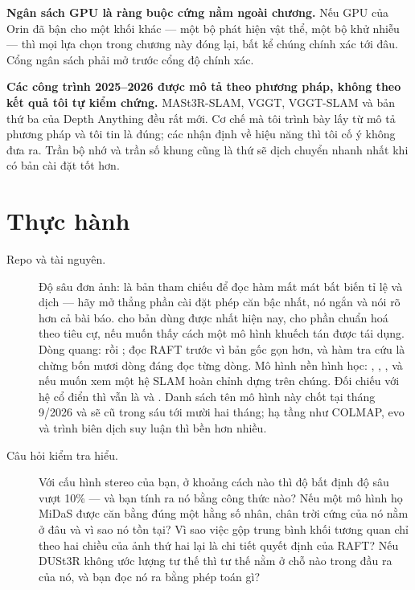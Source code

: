\documentclass[../../deep_learning.tex]{subfiles}
\begin{document}
\textbf{Ngân sách GPU là ràng buộc cứng nằm ngoài chương.} Nếu GPU của Orin đã bận cho một khối khác --- một bộ phát hiện vật thể, một bộ khử nhiễu --- thì mọi lựa chọn trong chương này đóng lại, bất kể chúng chính xác tới đâu. Cổng ngân sách phải mở trước cổng độ chính xác.

\textbf{Các công trình 2025--2026 được mô tả theo phương pháp, không theo kết quả tôi tự kiểm chứng.} MASt3R-SLAM, VGGT, VGGT-SLAM và bản thứ ba của Depth Anything đều rất mới. Cơ chế mà tôi trình bày lấy từ mô tả phương pháp và tôi tin là đúng; các nhận định về hiệu năng thì tôi cố ý không đưa ra. Trần bộ nhớ và trần số khung cũng là thứ sẽ dịch chuyển nhanh nhất khi có bản cài đặt tốt hơn.

\section{Thực hành}
\begin{description}
\item[Repo và tài nguyên.] Độ sâu đơn ảnh:  là bản tham chiếu để đọc hàm mất mát bất biến tỉ lệ và dịch --- hãy mở thẳng phần cài đặt phép căn bậc nhất, nó ngắn và nói rõ hơn cả bài báo.  cho bản dùng được nhất hiện nay,  cho phần chuẩn hoá theo tiêu cự,  nếu muốn thấy cách một mô hình khuếch tán được tái dụng. Dòng quang:  rồi ; đọc RAFT trước vì bản gốc gọn hơn, và hàm tra cứu là chừng bốn mươi dòng đáng đọc từng dòng. Mô hình nền hình học: , , , và  nếu muốn xem một hệ SLAM hoàn chỉnh dựng trên chúng. Đối chiếu với hệ cổ điển thì vẫn là  và . Danh sách tên mô hình này chốt tại tháng 9/2026 và sẽ cũ trong sáu tới mười hai tháng; hạ tầng như COLMAP, evo và trình biên dịch suy luận thì bền hơn nhiều.
\item[Câu hỏi kiểm tra hiểu.] Với cấu hình stereo của bạn, ở khoảng cách nào thì độ bất định độ sâu vượt 10\% --- và bạn tính ra nó bằng công thức nào? Nếu một mô hình họ MiDaS được căn bằng đúng một hằng số nhân, chân trời cứng của nó nằm ở đâu và vì sao nó tồn tại? Vì sao việc gộp trung bình khối tương quan chỉ theo hai chiều của ảnh thứ hai lại là chi tiết quyết định của RAFT? Nếu DUSt3R không ước lượng tư thế thì tư thế nằm ở chỗ nào trong đầu ra của nó, và bạn đọc nó ra bằng phép toán gì?
\end{description}
\end{document}
